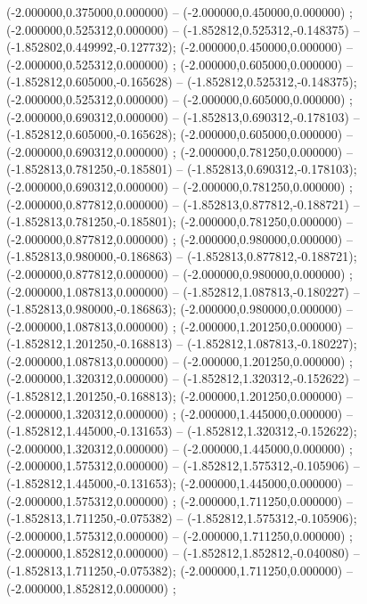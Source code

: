  (-2.000000,0.375000,0.000000) -- (-2.000000,0.450000,0.000000) ;
 (-2.000000,0.525312,0.000000) -- (-1.852812,0.525312,-0.148375) -- (-1.852802,0.449992,-0.127732);
 (-2.000000,0.450000,0.000000) -- (-2.000000,0.525312,0.000000) ;
 (-2.000000,0.605000,0.000000) -- (-1.852812,0.605000,-0.165628) -- (-1.852812,0.525312,-0.148375);
 (-2.000000,0.525312,0.000000) -- (-2.000000,0.605000,0.000000) ;
 (-2.000000,0.690312,0.000000) -- (-1.852813,0.690312,-0.178103) -- (-1.852812,0.605000,-0.165628);
 (-2.000000,0.605000,0.000000) -- (-2.000000,0.690312,0.000000) ;
 (-2.000000,0.781250,0.000000) -- (-1.852813,0.781250,-0.185801) -- (-1.852813,0.690312,-0.178103);
 (-2.000000,0.690312,0.000000) -- (-2.000000,0.781250,0.000000) ;
 (-2.000000,0.877812,0.000000) -- (-1.852813,0.877812,-0.188721) -- (-1.852813,0.781250,-0.185801);
 (-2.000000,0.781250,0.000000) -- (-2.000000,0.877812,0.000000) ;
 (-2.000000,0.980000,0.000000) -- (-1.852813,0.980000,-0.186863) -- (-1.852813,0.877812,-0.188721);
 (-2.000000,0.877812,0.000000) -- (-2.000000,0.980000,0.000000) ;
 (-2.000000,1.087813,0.000000) -- (-1.852812,1.087813,-0.180227) -- (-1.852813,0.980000,-0.186863);
 (-2.000000,0.980000,0.000000) -- (-2.000000,1.087813,0.000000) ;
 (-2.000000,1.201250,0.000000) -- (-1.852812,1.201250,-0.168813) -- (-1.852812,1.087813,-0.180227);
 (-2.000000,1.087813,0.000000) -- (-2.000000,1.201250,0.000000) ;
 (-2.000000,1.320312,0.000000) -- (-1.852812,1.320312,-0.152622) -- (-1.852812,1.201250,-0.168813);
 (-2.000000,1.201250,0.000000) -- (-2.000000,1.320312,0.000000) ;
 (-2.000000,1.445000,0.000000) -- (-1.852812,1.445000,-0.131653) -- (-1.852812,1.320312,-0.152622);
 (-2.000000,1.320312,0.000000) -- (-2.000000,1.445000,0.000000) ;
 (-2.000000,1.575312,0.000000) -- (-1.852812,1.575312,-0.105906) -- (-1.852812,1.445000,-0.131653);
 (-2.000000,1.445000,0.000000) -- (-2.000000,1.575312,0.000000) ;
 (-2.000000,1.711250,0.000000) -- (-1.852813,1.711250,-0.075382) -- (-1.852812,1.575312,-0.105906);
 (-2.000000,1.575312,0.000000) -- (-2.000000,1.711250,0.000000) ;
 (-2.000000,1.852812,0.000000) -- (-1.852812,1.852812,-0.040080) -- (-1.852813,1.711250,-0.075382);
 (-2.000000,1.711250,0.000000) -- (-2.000000,1.852812,0.000000) ;
